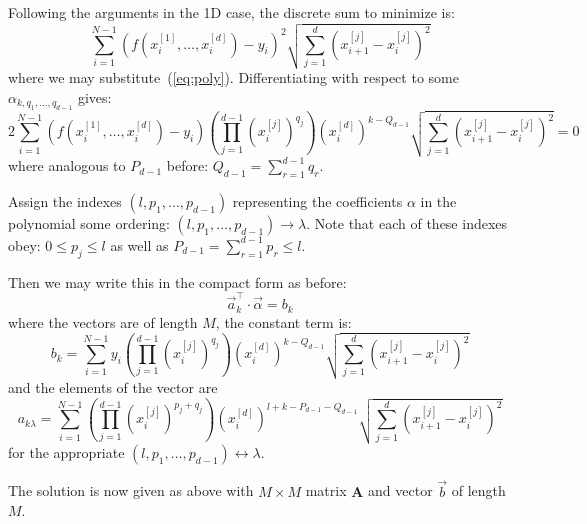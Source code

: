 \documentclass[11pt]{article}
\newcommand{\xdim}[1]{x^{[#1]}}
\begin{document}
Following the arguments in the 1D case, the discrete sum to minimize is:
\begin{equation}
\sum_{i=1}^{N-1} \left ( f(\xdim{1}_i,\dots,\xdim{d}_i) - y_i \right )^2 \sqrt{ \sum_{j=1}^d ( \xdim{j}_{i+1} - \xdim{j}_i )^2 }
\end{equation}
where we may substitute~(\ref{eq:poly}). Differentiating with respect to some $\alpha_{k,q_1,\dots,q_{d-1}}$ gives:
\begin{equation}
2 \sum_{i=1}^{N-1} \left ( f(\xdim{1}_i,\dots,\xdim{d}_i) - y_i \right ) 
\left ( \prod_{j=1}^{d-1} (\xdim{j}_i)^{q_j} \right ) (\xdim{d}_i)^{k - Q_{d-1}} 
\sqrt{ \sum_{j=1}^d ( \xdim{j}_{i+1} - \xdim{j}_i )^2 }
= 0
\end{equation}
where analogous to $P_{d-1}$ before: $Q_{d-1} = \sum_{r=1}^{d-1} q_r$.

Assign the indexes $(l,p_1,\dots,p_{d-1})$ representing the coefficients $\alpha$ in the polynomial some ordering: $(l,p_1,\dots,p_{d-1}) \rightarrow \lambda$. Note that each of these indexes obey: $0 \leq p_j \leq l$ as well as $P_{d-1} = \sum_{r=1}^{d-1} p_r \leq l$.

Then we may write this in the compact form as before:
\begin{equation}
\vec{a}_k^\intercal \cdot \vec{\alpha} = b_k
\end{equation}
where the vectors are of length $M$, the constant term is:
\begin{equation}
b_k = 
\sum_{i=1}^{N-1} 
y_i 
\left ( \prod_{j=1}^{d-1} (\xdim{j}_i)^{q_j} \right ) (\xdim{d}_i)^{k - Q_{d-1}} 
\sqrt{ \sum_{j=1}^d ( \xdim{j}_{i+1} - \xdim{j}_i )^2 }
\end{equation}
and the elements of the vector are
\begin{equation}
a_{k\lambda} = \sum_{i=1}^{N-1} 
\left ( \prod_{j=1}^{d-1} (\xdim{j}_i)^{p_j + q_j} \right ) 
(\xdim{d}_i)^{l + k - P_{d-1} - Q_{d-1}} 
\sqrt{ \sum_{j=1}^d ( \xdim{j}_{i+1} - \xdim{j}_i )^2 }
\end{equation}
for the appropriate $(l,p_1,\dots,p_{d-1}) \leftrightarrow \lambda$.

The solution is now given as above with $M \times M$ matrix $\boldsymbol{A}$ and vector $\vec{b}$ of length $M$.


\end{document}
